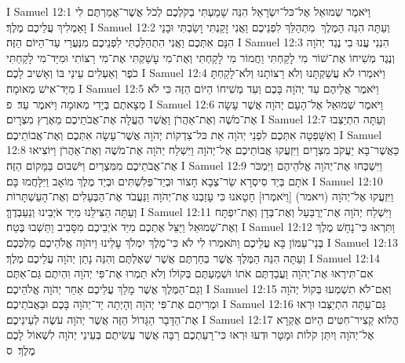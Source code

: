 I Samuel 12:1	וַיֹּאמֶר שְׁמוּאֵל אֶל־כּל־יִשְׂרָאֵל הִנֵּה שָׁמַעְתִּי בְקֹלְכֶם לְכֹל אֲשֶׁר־אֲמַרְתֶּם לִי וָאַמְלִיךְ עֲלֵיכֶם מֶלֶךְ׃
I Samuel 12:2	וְעַתָּה הִנֵּה הַמֶּלֶךְ  מִתְהַלֵּךְ לִפְנֵיכֶם וַאֲנִי זָקַנְתִּי וָשַׂבְתִּי וּבָנַי הִנָּם אִתְּכֶם וַאֲנִי הִתְהַלַּכְתִּי לִפְנֵיכֶם מִנְּעֻרַי עַד־הַיּוֹם הַזֶּה׃
I Samuel 12:3	הִנְנִי עֲנוּ בִי נֶגֶד יְהֹוָה וְנֶגֶד מְשִׁיחוֹ אֶת־שׁוֹר  מִי לָקַחְתִּי וַחֲמוֹר מִי לָקַחְתִּי וְאֶת־מִי עָשַׁקְתִּי אֶת־מִי רַצּוֹתִי וּמִיַּד־מִי לָקַחְתִּי כֹפֶר וְאַעְלִים עֵינַי בּוֹ וְאָשִׁיב לָכֶם׃
I Samuel 12:4	וַיֹּאמְרוּ לֹא עֲשַׁקְתָּנוּ וְלֹא רַצּוֹתָנוּ וְלֹא־לָקַחְתָּ מִיַּד־אִישׁ מְאוּמָה׃
I Samuel 12:5	וַיֹּאמֶר אֲלֵיהֶם עֵד יְהֹוָה בָּכֶם וְעֵד מְשִׁיחוֹ הַיּוֹם הַזֶּה כִּי לֹא מְצָאתֶם בְּיָדִי מְאוּמָה וַיֹּאמֶר עֵד׃ {פ}
I Samuel 12:6	וַיֹּאמֶר שְׁמוּאֵל אֶל־הָעָם יְהֹוָה אֲשֶׁר עָשָׂה אֶת־מֹשֶׁה וְאֶת־אַהֲרֹן וַאֲשֶׁר הֶעֱלָה אֶת־אֲבֹתֵיכֶם מֵאֶרֶץ מִצְרָיִם׃
I Samuel 12:7	וְעַתָּה הִתְיַצְּבוּ וְאִשָּׁפְטָה אִתְּכֶם לִפְנֵי יְהֹוָה אֵת כּל־צִדְקוֹת יְהֹוָה אֲשֶׁר־עָשָׂה אִתְּכֶם וְאֶת־אֲבוֹתֵיכֶם׃
I Samuel 12:8	כַּאֲשֶׁר־בָּא יַעֲקֹב מִצְרָיִם וַיִּזְעֲקוּ אֲבוֹתֵיכֶם אֶל־יְהֹוָה וַיִּשְׁלַח יְהֹוָה אֶת־מֹשֶׁה וְאֶת־אַהֲרֹן וַיּוֹצִיאוּ אֶת־אֲבֹתֵיכֶם מִמִּצְרַיִם וַיֹּשִׁבוּם בַּמָּקוֹם הַזֶּה׃
I Samuel 12:9	וַיִּשְׁכְּחוּ אֶת־יְהֹוָה אֱלֹהֵיהֶם וַיִּמְכֹּר אֹתָם בְּיַד סִיסְרָא שַׂר־צְבָא חָצוֹר וּבְיַד־פְּלִשְׁתִּים וּבְיַד מֶלֶךְ מוֹאָב וַיִּלָּחֲמוּ בָּם׃
I Samuel 12:10	וַיִּזְעֲקוּ אֶל־יְהֹוָה (ויאמר) [וַיֹּאמְרוּ] חָטָאנוּ כִּי עָזַבְנוּ אֶת־יְהֹוָה וַנַּעֲבֹד אֶת־הַבְּעָלִים וְאֶת־הָעַשְׁתָּרוֹת וְעַתָּה הַצִּילֵנוּ מִיַּד אֹיְבֵינוּ וְנַעַבְדֶךָּ׃
I Samuel 12:11	וַיִּשְׁלַח יְהֹוָה אֶת־יְרֻבַּעַל וְאֶת־בְּדָן וְאֶת־יִפְתָּח וְאֶת־שְׁמוּאֵל וַיַּצֵּל אֶתְכֶם מִיַּד אֹיְבֵיכֶם מִסָּבִיב וַתֵּשְׁבוּ בֶּטַח׃
I Samuel 12:12	וַתִּרְאוּ כִּי־נָחָשׁ מֶלֶךְ בְּנֵי־עַמּוֹן בָּא עֲלֵיכֶם וַתֹּאמְרוּ לִי לֹא כִּי־מֶלֶךְ יִמְלֹךְ עָלֵינוּ וַיהֹוָה אֱלֹהֵיכֶם מַלְכְּכֶם׃
I Samuel 12:13	וְעַתָּה הִנֵּה הַמֶּלֶךְ אֲשֶׁר בְּחַרְתֶּם אֲשֶׁר שְׁאֶלְתֶּם וְהִנֵּה נָתַן יְהֹוָה עֲלֵיכֶם מֶלֶךְ׃
I Samuel 12:14	אִם־תִּירְאוּ אֶת־יְהֹוָה וַעֲבַדְתֶּם אֹתוֹ וּשְׁמַעְתֶּם בְּקוֹלוֹ וְלֹא תַמְרוּ אֶת־פִּי יְהֹוָה וִהְיִתֶם גַּם־אַתֶּם וְגַם־הַמֶּלֶךְ אֲשֶׁר מָלַךְ עֲלֵיכֶם אַחַר יְהֹוָה אֱלֹהֵיכֶם׃
I Samuel 12:15	וְאִם־לֹא תִשְׁמְעוּ בְּקוֹל יְהֹוָה וּמְרִיתֶם אֶת־פִּי יְהֹוָה וְהָיְתָה יַד־יְהֹוָה בָּכֶם וּבַאֲבֹתֵיכֶם׃
I Samuel 12:16	גַּם־עַתָּה הִתְיַצְּבוּ וּרְאוּ אֶת־הַדָּבָר הַגָּדוֹל הַזֶּה אֲשֶׁר יְהֹוָה עֹשֶׂה לְעֵינֵיכֶם׃
I Samuel 12:17	הֲלוֹא קְצִיר־חִטִּים הַיּוֹם אֶקְרָא אֶל־יְהֹוָה וְיִתֵּן קֹלוֹת וּמָטָר וּדְעוּ וּרְאוּ כִּי־רָעַתְכֶם רַבָּה אֲשֶׁר עֲשִׂיתֶם בְּעֵינֵי יְהֹוָה לִשְׁאוֹל לָכֶם מֶלֶךְ׃ {ס}        

